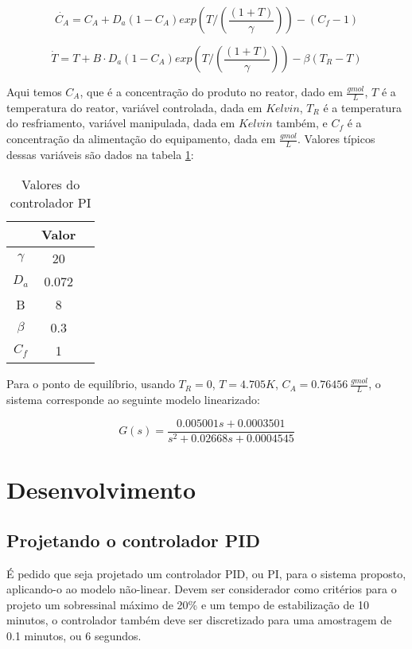 \documentclass[
	12pt,				%
	openany,			%
	oneside,			%
	a4paper,			%
	english,			%
	french,				%
	spanish,			%
	brazil,				%
	]{abntex2}
\begin{document}
{\begin{equation}
	\dot{C_A} = C_A + D_a(1-C_A)exp\left(T/\left(\frac{(1+T)}{\gamma}\right)\right) - (C_f - 1)
\end{equation}

\begin{equation}
	\dot{T} = T + B \cdot D_a(1-C_A)exp\left(T/\left(\frac{(1+T)}{\gamma}\right)\right) - \beta(T_R - T)
\end{equation}

Aqui temos $C_A$, que é a concentração do produto no reator, dado em $\frac{gmol}{L}$, $T$ é a temperatura do reator, variável controlada, dada em $Kelvin$, $T_R$ é a temperatura do resfriamento, variável manipulada, dada em $Kelvin$ também, e $C_f$ é a concentração da alimentação do equipamento, dada em $\frac{gmol}{L}$. Valores típicos dessas variáveis são dados na tabela \ref{tab:tabela_constantes}:

\begin{table}[h]
	\centering
	\begin{tabular}{ccc}
		\multicolumn{1}{c}{} 
	Constante & Valor &  \\ \hline
	$\gamma$ & 20 &  \\
	$D_a$ & 0.072 &  \\
	B & 8 &  \\
	$\beta$ & 0.3 &  \\
	$C_f$ & 1 & 
	\end{tabular}
	\caption{Valores do controlador PI}
	\label{tab:tabela_constantes}
\end{table}

Para o ponto de equilíbrio, usando $T_R=0$, $T=4.705K$, $C_A = 0.76456 \ \frac{gmol}{L}$, o sistema corresponde ao seguinte modelo linearizado:

\begin{equation}
	G(s) = \frac{0.005001s + 0.0003501}{s^2+0.02668s+0.0004545}
\end{equation}



\chapter{Desenvolvimento}

\section{Projetando o controlador PID}

É pedido que seja projetado um controlador PID, ou PI, para o sistema proposto, aplicando-o ao modelo não-linear. Devem ser considerador como critérios para o projeto um sobressinal máximo de 20\% e um tempo de estabilização de 10 minutos, o controlador também deve ser discretizado para uma amostragem de 0.1 minutos, ou 6 segundos.


}
\end{document}
